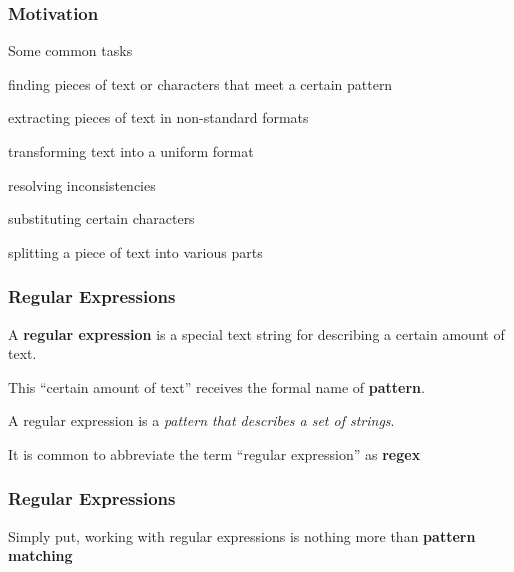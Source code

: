 \documentclass[12pt]{beamer}\usepackage[]{graphicx}\usepackage[]{color}
\begin{document}

\begin{frame}[fragile]
\frametitle{Motivation}

Some common tasks
\bi
  \item finding pieces of text or characters that meet a certain pattern
  \item extracting pieces of text in non-standard formats
  \item transforming text into a uniform format
  \item resolving inconsistencies
  \item substituting certain characters
  \item splitting a piece of text into various parts
\ei

\end{frame}


\begin{frame}
\begin{center}
\Huge{}
\end{center}
\end{frame}


\begin{frame}
\frametitle{Regular Expressions}

\bbi
  \item A \textbf{regular expression} is a special text string for describing a certain amount of text.
  \item This ``certain amount of text'' receives the formal name of \textbf{pattern}. 
  \item A regular expression is a \textit{pattern that describes a set of strings}.
  \item It is common to abbreviate the term ``regular expression'' as \textbf{regex}
\ei

\end{frame}


\begin{frame}
\frametitle{Regular Expressions}

{\Large Simply put, working with regular expressions is nothing more than \textbf{pattern matching}}

\end{frame}
\end{document}
